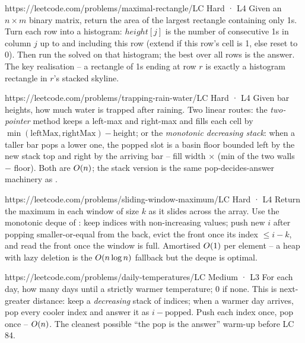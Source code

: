 \begin{practiceset}
    {https://leetcode.com/problems/maximal-rectangle/}{LC Hard · L4}
    {Given an $n\times m$ binary matrix, return the area of the largest rectangle containing only 1s.
    Turn each row into a histogram: $\mathit{height}[j]$ is the number of consecutive 1s in column $j$
    up to and including this row (extend if this row's cell is 1, else reset to 0). Then run the solved
     on that histogram; the best over all rows is the answer. The key realisation --
    a rectangle of 1s ending at row $r$ is exactly a histogram rectangle in $r$'s stacked skyline.}

    {https://leetcode.com/problems/trapping-rain-water/}{LC Hard · L4}
    {Given bar heights, how much water is trapped after raining. Two linear routes: the \emph{two-pointer}
    method keeps a left-max and right-max and fills each cell by $\min(\text{leftMax},\text{rightMax})-\text{height}$;
    or the \emph{monotonic decreasing stack}: when a taller bar pops a lower one, the popped slot is a
    basin floor bounded left by the new stack top and right by the arriving bar -- fill width $\times$
    (min of the two walls $-$ floor). Both are $O(n)$; the stack version is the same pop-decides-answer
    machinery as .}

    {https://leetcode.com/problems/sliding-window-maximum/}{LC Hard · L4}
    {Return the maximum in each window of size $k$ as it slides across the array. Use the monotonic
    deque of : keep indices with non-increasing values; push new $i$ after popping
    smaller-or-equal from the back, evict the front once its index $\le i-k$, and read the front once the
    window is full. Amortised $O(1)$ per element -- a heap with lazy deletion is the $O(n\log n)$
    fallback but the deque is optimal.}

    {https://leetcode.com/problems/daily-temperatures/}{LC Medium · L3}
    {For each day, how many days until a strictly warmer temperature; $0$ if none. This is next-greater
    distance: keep a \emph{decreasing} stack of indices; when a warmer day arrives, pop every cooler index
    and answer it as $i - \text{popped}$. Push each index once, pop once -- $O(n)$. The cleanest
    possible ``the pop is the answer'' warm-up before LC 84.}
\end{practiceset}

